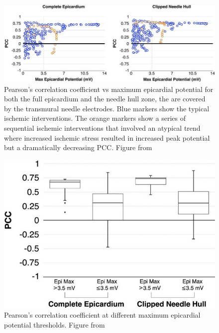 \documentclass[12pt]{article}
\begin{document}
\begin{figure}[H]
	\centering
	\includegraphics[width=(\textwidth)]{Figures/Paper2Result2.png}
	\caption{Pearson's correlation coefficient vs maximum epicardial potential for both the full epicardium and the needle hull zone, the are covered by the transmural needle electrodes. Blue markers show the typical ischemic interventions. The orange markers show a series of sequential ischemic interventions that involved an atypical trend where increased ischemic stress resulted in increased peak potential but a dramatically decreasing PCC. Figure from \cite{RSM:Bur2018b}}
	\label{p2r2}
\end{figure}
\begin{figure}[H]
	\centering
	\includegraphics[width=(\textwidth)]{Figures/Paper2Result3.png}
	\caption{Pearson's correlation coefficient at different maximum epicardial potential thresholds. Figure from \cite{RSM:Bur2018b}}
	\label{p2r3}
\end{figure}


\end{document}
